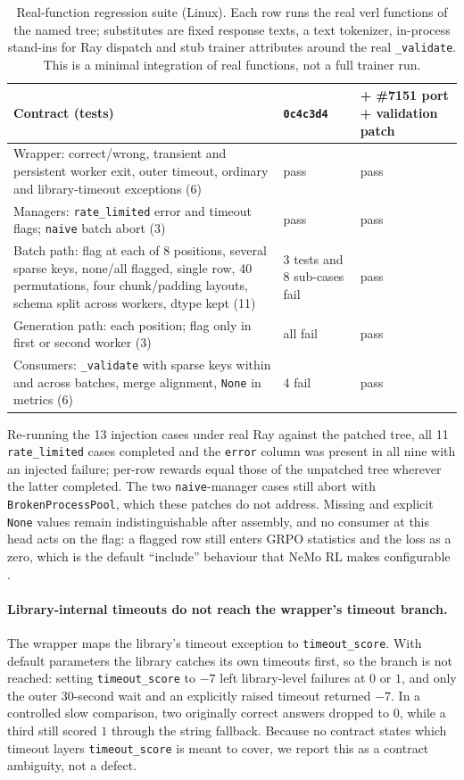 \documentclass[10pt,a4paper]{article}
\let\cite\citep
\begin{document}
\begin{table}[h]
\centering
\caption{Real-function regression suite (Linux). Each row
runs the real verl functions of the named tree; substitutes are fixed response
texts, a text tokenizer, in-process stand-ins for Ray dispatch and stub
trainer attributes around the real \texttt{\_validate}. This is a minimal
integration of real functions, not a full trainer run.}
\label{tab:suite}
\small
\begin{tabular}{@{}p{8.2cm}p{2.1cm}p{2.6cm}@{}}
\toprule
Contract (tests) & \texttt{0c4c3d4} & + \#7151 port + validation patch \\
\midrule
Wrapper: correct/wrong, transient and persistent worker exit, outer timeout, ordinary and library-timeout exceptions (6) & pass & pass \\
Managers: \texttt{rate\_limited} error and timeout flags; \texttt{naive} batch abort (3) & pass & pass \\
Batch path: flag at each of 8 positions, several sparse keys, none/all flagged, single row, 40 permutations, four chunk/padding layouts, schema split across workers, dtype kept (11) & 3 tests and 8 sub-cases fail & pass \\
Generation path: each position; flag only in first or second worker (3) & all fail & pass \\
Consumers: \texttt{\_validate} with sparse keys within and across batches, merge alignment, \texttt{None} in metrics (6) & 4 fail & pass \\
\bottomrule
\end{tabular}
\end{table}

Re-running the 13 injection cases under real Ray against the patched tree,
all 11 \texttt{rate\_limited} cases completed and the \texttt{error} column
was present in all nine with an injected failure; per-row rewards equal those
of the unpatched tree wherever the latter completed. The two
\texttt{naive}-manager cases still abort with \texttt{BrokenProcessPool},
which these patches do not address. Missing and explicit \texttt{None}
values remain indistinguishable after assembly, and no consumer at this head
acts on the flag: a flagged row still enters GRPO statistics and the loss as
a zero, which is the default ``include'' behaviour that NeMo RL makes
configurable \cite{nemorl2026masked}.

\paragraph{Library-internal timeouts do not reach the wrapper's timeout branch.}
The wrapper maps the library's timeout exception to \texttt{timeout\_score}.
With default parameters the library catches its own timeouts first, so the
branch is not reached: setting \texttt{timeout\_score} to $-7$ left
library-level failures at $0$ or $1$, and only the outer 30-second wait and an
explicitly raised timeout returned $-7$. In a controlled slow comparison, two
originally correct answers dropped to $0$, while a third still scored $1$
through the string fallback. Because no contract states which timeout layers
\texttt{timeout\_score} is meant to cover, we report this as a contract
ambiguity, not a defect.
\end{document}
